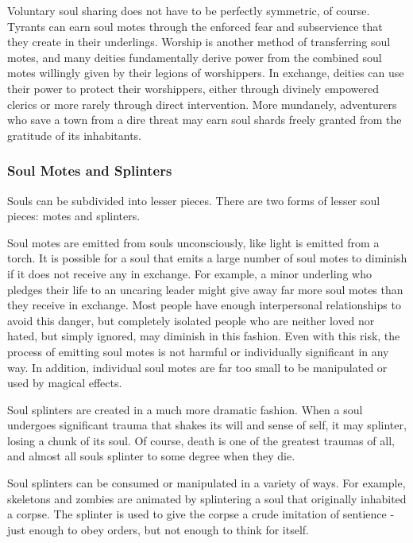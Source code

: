       Voluntary soul sharing does not have to be perfectly symmetric, of course.
      Tyrants can earn soul motes through the enforced fear and subservience that they create in their underlings.
      Worship is another method of transferring soul motes, and many deities fundamentally derive power from the combined soul motes willingly given by their legions of worshippers.
      In exchange, deities can use their power to protect their worshippers, either through divinely empowered clerics or more rarely through direct intervention.
      More mundanely, adventurers who save a town from a dire threat may earn soul shards freely granted from the gratitude of its inhabitants.

    \subsubsection{Soul Motes and Splinters}
      Souls can be subdivided into lesser pieces.
      There are two forms of lesser soul pieces: motes and splinters.

      Soul motes are emitted from souls unconsciously, like light is emitted from a torch.
      It is possible for a soul that emits a large number of soul motes to diminish if it does not receive any in exchange.
      For example, a minor underling who pledges their life to an uncaring leader might give away far more soul motes than they receive in exchange.
      Most people have enough interpersonal relationships to avoid this danger, but completely isolated people who are neither loved nor hated, but simply ignored, may diminish in this fashion.
      Even with this risk, the process of emitting soul motes is not harmful or individually significant in any way.
      In addition, individual soul motes are far too small to be manipulated or used by magical effects.

      Soul splinters are created in a much more dramatic fashion.
      When a soul undergoes significant trauma that shakes its will and sense of self, it may splinter, losing a chunk of its soul.
      Of course, death is one of the greatest traumas of all, and almost all souls splinter to some degree when they die.

      Soul splinters can be consumed or manipulated in a variety of ways.
      For example, skeletons and zombies are animated by splintering a soul that originally inhabited a corpse.
      The splinter is used to give the corpse a crude imitation of sentience - just enough to obey orders, but not enough to think for itself.

